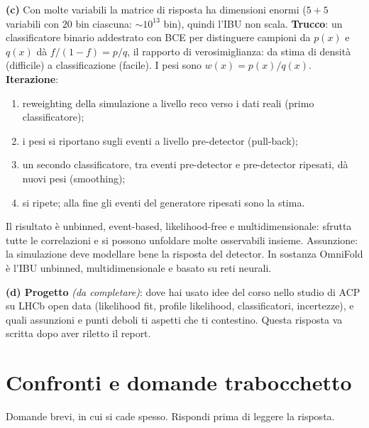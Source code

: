 \documentclass[11pt,a4paper]{article}
\begin{document}
{\textbf{(c)} Con molte variabili la matrice di risposta ha dimensioni enormi ($5{+}5$ variabili con $20$ bin ciascuna: $\sim10^{13}$ bin), quindi l'IBU non scala.
\textbf{Trucco}: un classificatore binario addestrato con BCE per distinguere campioni da $p(x)$ e $q(x)$ d\`a $f/(1-f)=p/q$, il rapporto di verosimiglianza: da stima di densit\`a (difficile) a classificazione (facile). I pesi sono $w(x)=p(x)/q(x)$.
\textbf{Iterazione}:
\begin{enumerate}
\item reweighting della simulazione a livello reco verso i dati reali (primo classificatore);
\item i pesi si riportano sugli eventi a livello pre-detector (pull-back);
\item un secondo classificatore, tra eventi pre-detector e pre-detector ripesati, d\`a nuovi pesi (smoothing);
\item si ripete; alla fine gli eventi del generatore ripesati sono la stima.
\end{enumerate}
Il risultato \`e unbinned, event-based, likelihood-free e multidimensionale: sfrutta tutte le correlazioni e si possono unfoldare molte osservabili insieme.
Assunzione: la simulazione deve modellare bene la risposta del detector.
In sostanza OmniFold \`e l'IBU unbinned, multidimensionale e basato su reti neurali.

\textbf{(d) Progetto} \emph{(da completare)}: dove hai usato idee del corso nello studio di ACP su LHCb open data (likelihood fit, profile likelihood, classificatori, incertezze), e quali assunzioni e punti deboli ti aspetti che ti contestino. Questa risposta va scritta dopo aver riletto il report.
}

\section{Confronti e domande trabocchetto}

Domande brevi, in cui si cade spesso. Rispondi prima di leggere la risposta.
\end{document}
